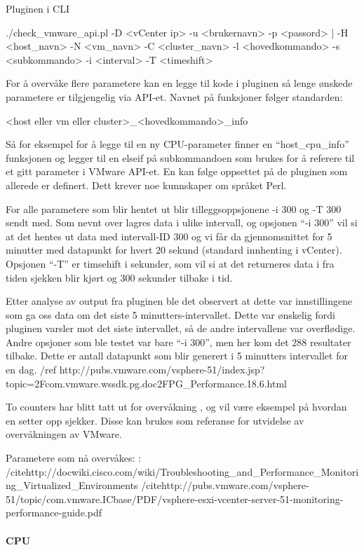 Pluginen i CLI

./check\_vmware\_api.pl -D <vCenter ip> -u <brukernavn> -p <passord> | -H <host\_navn> -N <vm\_navn> -C <cluster\_navn>  -l <hovedkommando> -s <subkommando> -i <interval> -T <timeshift>

For å overvåke flere parametere kan en legge til kode i pluginen så lenge ønskede parametere er tilgjengelig via API-et. Navnet på funksjoner følger standarden:

<host eller vm eller cluster>\_<hovedkommando>\_info 

Så for eksempel for å legge til en ny CPU-parameter finner en “host\_cpu\_info” funksjonen og legger til en elseif på subkommandoen som brukes for å referere til et gitt parameter i VMware API-et. En kan følge oppsettet på de pluginen som allerede er definert. Dett krever noe kunnskaper om språket Perl.

For alle parametere som blir hentet ut blir tilleggsoppsjonene -i 300 og -T 300 sendt med.
Som nevnt over lagres data i ulike intervall, og opsjonen “-i 300” vil si at det hentes ut data med intervall-ID 300 og vi får da gjennomsnittet for 5 minutter med datapunkt for hvert 20 sekund (standard innhenting i vCenter). Opsjonen “-T” er timsehift i sekunder, som vil si at det returneres data i fra tiden sjekken blir kjørt og 300 sekunder tilbake i tid. 

Etter analyse av output fra pluginen ble det observert at dette var innstillingene som ga oss data om det siste 5 minutters-intervallet. Dette var ønskelig fordi pluginen varsler mot det siste intervallet, så de andre intervallene var overflødige. Andre opsjoner som ble testet var bare “-i 300”, men her kom det 288 resultater tilbake. Dette er antall datapunkt som blir generert i 5 minutters intervallet for en dag. /ref http://pubs.vmware.com/vsphere-51/index.jsp?topic=2Fcom.vmware.wssdk.pg.doc2FPG\_Performance.18.6.html

To counters har blitt tatt ut for overvåkning , og vil være eksempel på hvordan en setter opp sjekker. Disse kan brukes som referanse for utvidelse av overvåkningen av VMware. 

 Parametere som nå overvåkes: : 
/citehttp://docwiki.cisco.com/wiki/Troubleshooting\_and\_Performance\_Monitoring\_Virtualized\_Environments
/citehttp://pubs.vmware.com/vsphere-51/topic/com.vmware.ICbase/PDF/vsphere-esxi-vcenter-server-51-monitoring-performance-guide.pdf

\paragraph{CPU}


